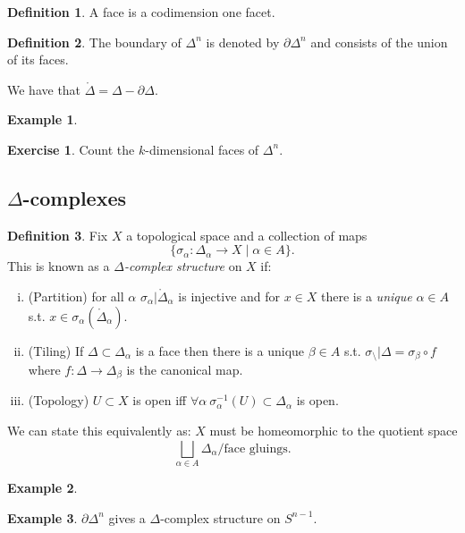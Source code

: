 \documentclass[12pt]{article}
\theoremstyle{definition}
\theoremstyle{definition}
\newtheorem*{defn}{Definition}
\newtheorem*{ex}{Example}
\newtheorem*{exer}{Exercise}
\begin{document}
\begin{defn}
A face is a codimension one facet.
\end{defn}

\begin{defn}
The boundary of $\Delta^n$ is denoted by $\partial \Delta^n$ and consists of the union of its faces.
\end{defn}

We have that $\mathring{\Delta} =\Delta - \partial \Delta$.

\begin{ex}
\end{ex}

\begin{exer}
Count the $k$-dimensional faces of $\Delta^n$.
\end{exer}

\subsection{$\Delta$-complexes}
\begin{defn}
Fix $X$ a topological space and a collection of maps
\[\{\sigma_\alpha \colon \Delta_\alpha \to X \mid \alpha \in A\}.\]
This is known as a \emph{$\Delta$-complex structure} on $X$ if:
\begin{enumerate}[(i)]
\item (Partition) for all $\alpha$ $\sigma_\alpha|\mathring{\Delta}_\alpha$ is injective and for $x\in X$ there is a \emph{unique} $\alpha\in A$ s.t. $x\in\sigma_\alpha(\mathring{\Delta}_\alpha)$.
\item (Tiling) If $\Delta\subset \Delta_\alpha$ is a face then there is a unique $\beta\in A$ s.t. $\sigma_\setminus|\Delta = \sigma_\beta\circ f$ where $f \colon \Delta \to \Delta_\beta$ is the canonical map.
\item (Topology) $U\subset X$ is open iff $\forall \alpha\ \sigma^{-1}_\alpha (U) \subset \Delta_\alpha$ is open.
\end{enumerate}
\end{defn}

We can state this equivalently as: $X$ must be homeomorphic to the quotient space
\[\bigsqcup_{\alpha\in A} \Delta_\alpha / \text{face gluings}.\]

\begin{ex}
\end{ex}

\begin{ex}
$\partial \Delta^n$ gives a $\Delta$-complex structure on $S^{n-1}$.
\end{ex}
\end{document}
